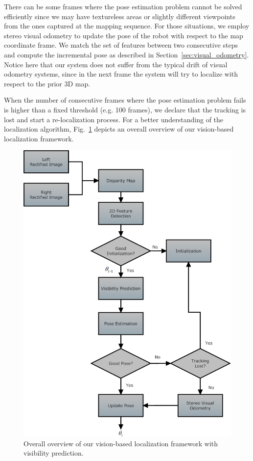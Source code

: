 There can be some frames where the pose estimation problem cannot be solved efficiently since we may have textureless areas or slightly different viewpoints from the ones captured at the mapping
sequence. For those situations, we employ stereo visual odometry to update the pose of the robot with respect to the map coordinate frame. We match the set of features between two consecutive steps and
compute the incremental pose as described in Section~\ref{sec:visual_odometry}. Notice here that our system does not suffer from the typical drift of visual odometry systems, since in the next frame the system will try to localize with respect to the prior 3D map.

When the number of consecutive frames where the pose estimation problem fails is higher than a fixed threshold (e.g. 100 frames), we declare that the tracking is lost and start a re-localization process. For a better understanding of the localization algorithm, Fig.~\ref{fig:vision_localization} depicts an overall overview of our vision-based localization framework.
%
\begin{figure}[ht!]
  \begin{center}
    \includegraphics[width=\linewidth]{images/vision_based_localization.png}
  \end{center}
  \caption{Overall overview of our vision-based localization framework with visibility prediction.\label{fig:vision_localization}}
\end{figure}
%
